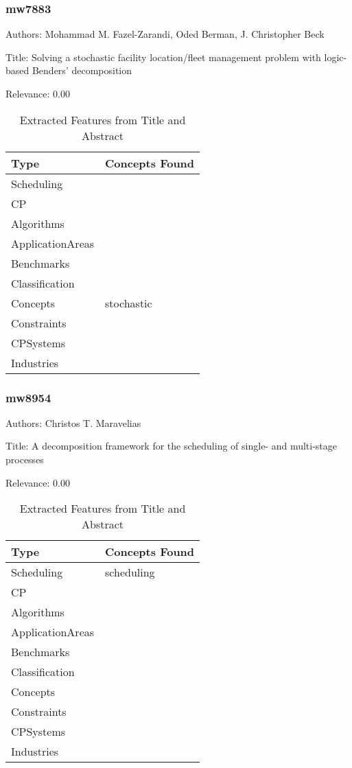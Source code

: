 \subsubsection{mw7883}
\label{mw:mw7883}

Authors: Mohammad M. Fazel-Zarandi, Oded Berman, J. Christopher Beck

Title: Solving a stochastic facility location/fleet management problem with logic-based Benders' decomposition

Relevance:  0.00

{\scriptsize
\begin{longtable}{p{2cm}p{20cm}}
\caption{Extracted Features from Title and Abstract}\\ \toprule
Type & Concepts Found\\ \midrule
\endhead
\bottomrule
\endfoot
Scheduling & \\ 
CP & \\ 
Algorithms & \\ 
ApplicationAreas & \\ 
Benchmarks & \\ 
Classification & \\ 
Concepts & stochastic\\ 
Constraints & \\ 
CPSystems & \\ 
Industries & \\ 
\end{longtable}
}



\subsubsection{mw8954}
\label{mw:mw8954}

Authors: Christos T. Maravelias

Title: A decomposition framework for the scheduling of single- and multi-stage processes

Relevance:  0.00

{\scriptsize
\begin{longtable}{p{2cm}p{20cm}}
\caption{Extracted Features from Title and Abstract}\\ \toprule
Type & Concepts Found\\ \midrule
\endhead
\bottomrule
\endfoot
Scheduling & scheduling\\ 
CP & \\ 
Algorithms & \\ 
ApplicationAreas & \\ 
Benchmarks & \\ 
Classification & \\ 
Concepts & \\ 
Constraints & \\ 
CPSystems & \\ 
Industries & \\ 
\end{longtable}
}




